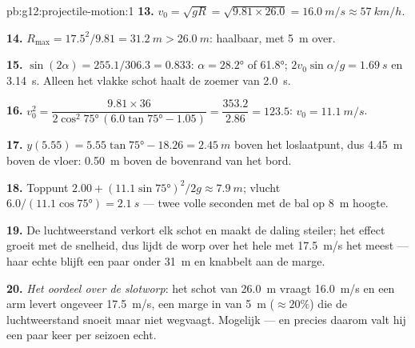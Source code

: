 \begin{solution}{pb:g12:projectile-motion:1}
\textbf{13.} $v_0 = \sqrt{gR} = \sqrt{9.81 \times 26.0} = \qty{16.0}{m/s}
\approx \qty{57}{km/h}$.

\textbf{14.} $R_{\max} = 17.5^2/9.81 = \qty{31.2}{m} > \qty{26.0}{m}$:
haalbaar, met \qty{5}{m}  over.

\textbf{15.} $\sin(2\alpha) = 255.1/306.3 = 0.833$: $\alpha = \ang{28.2}$ of
\ang{61.8};  $2v_0\sin\alpha/g = \qty{1.69}{s}$ en
\qty{3.14}{s}. Alleen het vlakke schot haalt de zoemer van \qty{2.0}{s}.

\textbf{16.} $v_0^2 = \dfrac{9.81 \times 36}{2\cos^2\ang{75}\,
(6.0\tan\ang{75} - 1.05)} = \dfrac{353.2}{2.86} = 123.5$:
$v_0 = \qty{11.1}{m/s}$.

\textbf{17.} $y(5.55) = 5.55\tan\ang{75} - 18.26 = \qty{2.45}{m}$ boven het
loslaatpunt, dus \qty{4.45}{m} boven de vloer: \qty{0.50}{m} boven de
bovenrand van het bord.

\textbf{18.} Toppunt $2.00 + (11.1\sin\ang{75})^2/2g \approx \qty{7.9}{m}$;
vlucht $6.0/(11.1\cos\ang{75}) = \qty{2.1}{s}$ --- twee volle seconden met de
bal op \qty{8}{m} hoogte.

\textbf{19.} De luchtweerstand verkort elk schot en maakt de daling steiler; het
effect groeit met de snelheid, dus lijdt de worp over het hele  met
\qty{17.5}{m/s} het meest --- haar echte  blijft een paar  onder
\qty{31}{m} en knabbelt aan de marge.

\textbf{20.} \emph{Het oordeel over de slotworp}: het schot van \qty{26.0}{m}
vraagt \qty{16.0}{m/s} en een arm levert ongeveer \qty{17.5}{m/s}, een marge
in  van \qty{5}{m} ($\approx 20\%$) die de luchtweerstand snoeit maar
niet wegvaagt. Mogelijk --- en precies daarom valt hij een paar keer per
seizoen echt.
\end{solution}
